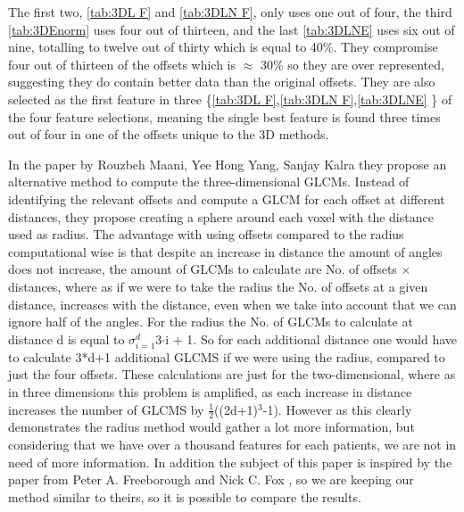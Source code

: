 The first two, \ref{tab:3DL F} and \ref{tab:3DLN F}, only uses one out of four, the third \ref{tab:3DEnorm} uses four out of thirteen, and the last \ref{tab:3DLNE} uses six out of nine, totalling to twelve out of thirty which is equal to 40\%. They compromise four out of thirteen of the offsets which is $\approx$ 30\% so they are  over represented, suggesting they do contain better data than the original offsets. They are also selected as the first feature in three \{\ref{tab:3DL F},\ref{tab:3DLN F},\ref{tab:3DLNE} \} of the four feature selections, meaning the single best feature is found three times out of four in one of the offsets unique to the 3D methods.




%

In the paper by Rouzbeh Maani, Yee Hong Yang, Sanjay Kalra \cite{Voxel} they propose an alternative method to compute the three-dimensional GLCMs. Instead of identifying the relevant offsets and compute a GLCM for each offset at different distances, they propose creating a sphere around each voxel with the distance used as radius.
The advantage with using offsets compared to the radius computational wise is that despite an increase in distance the amount of angles does not increase, the amount of GLCMs to calculate are No. of offsets $\times$ distances, where as if we were to take the radius the No. of offsets at a given distance, increases with the distance, even when we take into account that we can ignore half of the angles. For  the radius the No. of GLCMs to calculate at distance d is equal to $\sigma_{i=1}^d$3$\cdot$i + 1. So for each additional distance one would have to calculate 3*d+1 additional GLCMS if we were using the radius, compared to just the four offsets. These calculations are just for the two-dimensional, where as in three dimensions this problem is amplified, as each increase in distance increases the number of GLCMS by $\frac{1}{2}$((2d+1)$^3$-1). However as this clearly demonstrates the radius method would gather a lot more information, but considering that we have over a thousand features for each patients, we are not in need of more information. In addition the subject of this paper is inspired by the paper from Peter A. Freeborough and Nick C. Fox \cite{MRfreeborough}, so we are keeping our method similar to theirs, so it  is possible to compare the results.

